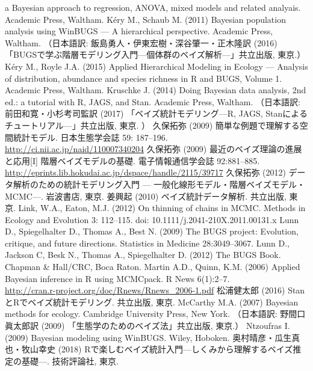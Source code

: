 \documentclass[11pt,uplatex]{jsarticle}
\begin{document}
\begin{thebibliography}{99}
  a Bayesian approach to regression, ANOVA, mixed models and related analyais.
  Academic Press, Waltham.
 K\'ery M., Schaub M. (2011) Bayesian population analysis using WinBUGS --- A hierarchical perspective.
  Academic Press, Waltham.
    （日本語訳: 飯島勇人・伊東宏樹・深谷肇一・正木隆訳 (2016) 「BUGSで学ぶ階層モデリング入門---個体群のベイズ解析---」共立出版, 東京.）
 K\'ery M., Royle J.A. (2015) Applied Hierarchical Modeling in Ecology --- Analysis of distribution, abundance and species richness in R and BUGS, Volume 1. Academic Press, Waltham.
 Kruschke J. (2014) Doing Bayesian data analysis, 2nd ed.:
  a tutorial with R, JAGS, and Stan. Academic Press, Waltham.
  （日本語訳: 前田和寛・小杉考司監訳 (2017) 「ベイズ統計モデリング---R, JAGS, Stanによるチュートリアル---」共立出版, 東京. ）
 久保拓弥 (2009) 簡単な例題で理解する空間統計モデル. 
  日本生態学会誌 59: 187--196. \\
  \url{http://ci.nii.ac.jp/naid/110007340204}
 久保拓弥 (2009) 最近のベイズ理論の進展と応用[I]
  階層ベイズモデルの基礎. 電子情報通信学会誌 92:881--885.\\
  \url{http://eprints.lib.hokudai.ac.jp/dspace/handle/2115/39717}
 久保拓弥 (2012) データ解析のための統計モデリング入門 ---
   一般化線形モデル・階層ベイズモデル・MCMC---. 岩波書店, 東京.
 姜興起 (2010) ベイズ統計データ解析. 共立出版, 東京.
 Link, W.A., Eaton, M.J. (2012) On thinning of chains in MCMC.
Methods in Ecology and Evolution 3: 112--115. doi: 10.1111/j.2041-210X.2011.00131.x
 Lunn D., Spiegelhalter D., Thomas A., Best N. (2009)
  {The BUGS project: Evolution, critique, and future directions}.
  {Statistics in Medicine} {28}:3049--3067.
 Lunn D., Jackson C, Besk N., Thomas A., Spiegelhalter D.
  (2012) The {BUGS} Book. Chapman \& Hall/CRC, Boca Raton.
 Martin A.D., Quinn, K.M. (2006) Applied Bayesian inference in R
using MCMCpack. R News 6(1):2--7. \\
    \url{http://cran.r-project.org/doc/Rnews/Rnews_2006-1.pdf}
 松浦健太郎 (2016) StanとRでベイズ統計モデリング. 共立出版, 東京.
 McCarthy M.A. (2007) Bayesian methods for ecology.
  Cambridge University Press, New York.
  （日本語訳: 野間口眞太郎訳 (2009) 「生態学のためのベイズ法」共立出版, 東京.）
 Ntzoufras I. (2009) Bayesian modeling using WinBUGS.
  Wiley, Hoboken.
 奥村晴彦・瓜生真也・牧山幸史 (2018) Rで楽しむベイズ統計入門---しくみから理解するベイズ推定の基礎---. 技術評論社, 東京.

\end{thebibliography}
\end{document}
